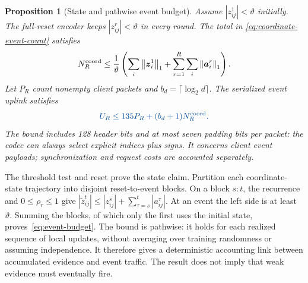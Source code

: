 \documentclass[conference]{IEEEtran}
\newcommand{\norm}[1]{\left\lVert#1\right\rVert}
\newcommand{\vect}[1]{\boldsymbol{#1}}
\newcommand{\rev}[1]{#1}
\newcommand{\newrev}[1]{#1}
\newcommand{\coreColor}{\color{coreblue}}
\newcommand{\coreRev}[1]{{\coreColor #1}}
\newtheorem{proposition}{Proposition}
\begin{document}
\begin{proposition}[State and pathwise event budget]
Assume $|z_{ij}^1|<\vartheta$ initially. The full-reset encoder keeps
$|z_{ij}^r|<\vartheta$ in every round. \rev{The total in
\eqref{eq:coordinate-event-count} satisfies}
\begin{equation}
 N_R^{\rm coord}\leq\frac{1}{\vartheta}
 \left(\sum_i\norm{\vect{z}_i^1}_1+
 \sum_{r=1}^R\sum_i\norm{\vect{a}_i^r}_1\right).
 \label{eq:event-budget}
\end{equation}
\coreRev{Let $P_R$ count nonempty client packets and
$b_d=\lceil\log_2d\rceil$. The serialized event uplink satisfies}
\begin{equation}
 \coreRev{U_R\leq135P_R+(b_d+1)N_R^{\rm coord}.}
 \label{eq:encoded-uplink-bound}
\end{equation}
\coreRev{The bound includes 128 header bits and at most seven padding bits
per packet: the codec can always select explicit indices plus signs.
It concerns client event payloads; synchronization and request costs are
accounted separately.}
\end{proposition}
The threshold test and reset prove the state claim. Partition each \newrev{coordinate-state}
trajectory into disjoint reset-to-event blocks. On a block $s{:}t$, the
recurrence and $0\leq\rho_r\leq1$ give
$|\widetilde z_{ij}^{t}|\leq|z_{ij}^{s}|+\sum_{\tau=s}^{t}|a_{ij}^{\tau}|$.
At an event the left side is at least $\vartheta$. Summing the blocks, of which
only the first uses the initial state, proves~\eqref{eq:event-budget}. The bound
\rev{is pathwise: it holds for each realized sequence of local updates, without
averaging over training randomness or assuming independence. It therefore
gives a deterministic accounting link between accumulated evidence and event
traffic. The result does not imply that weak evidence must eventually fire.}
\end{document}
